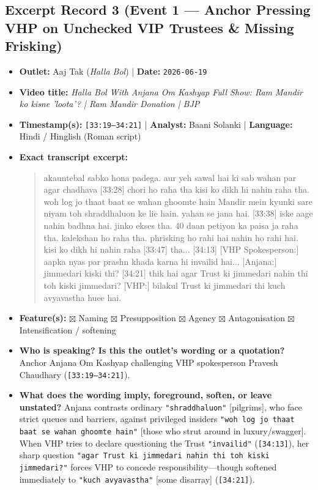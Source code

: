 \documentclass[10pt,a4paper]{article}
\begin{document}
\subsection*{Excerpt Record 3 (Event 1 --- Anchor Pressing VHP on Unchecked VIP Trustees \& Missing Frisking)}
\begin{itemize}[leftmargin=1.5em, itemsep=3pt, topsep=4pt]
  \item \textbf{Outlet:} Aaj Tak (\textit{Halla Bol}) | \textbf{Date:} \texttt{2026-06-19}
  \item \textbf{Video title:} \textit{Halla Bol With Anjana Om Kashyap Full Show: Ram Mandir ko kisne 'loota'? | Ram Mandir Donation | BJP}
  \item \textbf{Timestamp(s):} \texttt{[33:19--34:21]} | \textbf{Analyst:} Baani Solanki | \textbf{Language:} Hindi / Hinglish (Roman script)
  \item \textbf{Exact transcript excerpt:}
    \begin{quote}\small{} akauntebal sabko hona padega. aur yeh sawal hai ki sab wahan par agar chadhava [33:28] chori ho raha tha kisi ko dikh hi nahin raha tha. woh log jo thaat baat se wahan ghoomte hain Mandir mein kyunki sare niyam toh shraddhaluon ke lie hain. yahan se jana hai. [33:38] iske aage nahin badhna hai. jinko ekses tha. 40 daan petiyon ka paisa ja raha tha. kalekshan ho raha tha. phrisking ho rahi hai nahin ho rahi hai. kisi ko dikh hi nahin raha [33:47] tha... [34:13] [VHP Spokesperson:] aapka nyas par prashn khada karna hi invailid hai... [Anjana:] jimmedari kiski thi? [34:21] thik hai agar Trust ki jimmedari nahin thi toh kiski jimmedari? [VHP:] bilakul Trust ki jimmedari thi kuch avyavastha huee hai.\end{quote}
  \item \textbf{Feature(s):} $\boxtimes$ Naming $\boxtimes$ Presupposition $\boxtimes$ Agency $\boxtimes$ Antagonisation $\boxtimes$ Intensification / softening
  \item \textbf{Who is speaking? Is this the outlet's wording or a quotation?} Anchor Anjana Om Kashyap challenging VHP spokesperson Pravesh Chaudhary (\texttt{[33:19--34:21]}).
  \item \textbf{What does the wording imply, foreground, soften, or leave unstated?} Anjana contrasts ordinary \texttt{"shraddhaluon"} [pilgrims], who face strict queues and barriers, against privileged insiders \texttt{"woh log jo thaat baat se wahan ghoomte hain"} [those who strut around in luxury/swagger]. When VHP tries to declare questioning the Trust \texttt{"invailid"} (\texttt{[34:13]}), her sharp question \texttt{"agar Trust ki jimmedari nahin thi toh kiski jimmedari?"} forces VHP to concede responsibility---though softened immediately to \texttt{"kuch avyavastha"} [some disarray] (\texttt{[34:21]}).

\end{itemize}
\end{document}
